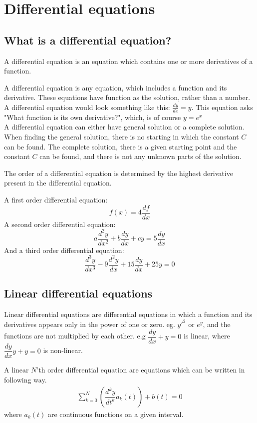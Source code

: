 \chapter{Differential equations}
\section{What is a differential equation?}
\begin{tcolorbox}[colback=blue!5!white,colframe=blue!75!black,title=Definition: Differential equation] 
A differential equation is an equation which contains one or more derivatives of a function.
\end{tcolorbox}
A differential equation is any equation, which includes a function and its derivative. These equations have function as the solution, rather than a number. 
\\
A differential equation would look something like this: $\frac{dy}{dx} = y$. This equation asks "What function is its own derivative?", which, is of course $y=e^x$
\\
A differential equation can either have general solution or a complete solution. When finding the general solution, there is no starting in which the constant $C$ can be found. The complete solution, there is a given starting point and the constant $C$ can be found, and there is not any unknown parts of the solution.
\\
\begin{tcolorbox}[colback=blue!5!white,colframe=blue!75!black,title=Definition: Order of a differential equation]
The order of a differential equation is determined by the highest derivative present in the differential equation.
\end{tcolorbox} 
\begin{tcolorbox}[colback=red!5!white,colframe=red!55!black,title=Example of differential equation of different orders] 
A first order differential equation:
$$f(x)=4\frac{df}{dx} $$
A second order differential equation:
$$a\frac{d^2y}{dx^2}+b\frac{dy}{dx}+cy = 5\frac{dy}{dx}$$
And a third order differential equation:
$$\frac{d^3y}{dx^3} - 9\frac{d^2y}{dx} + 15\frac{dy}{dx} + 25y = 0$$
\end{tcolorbox}
\section{Linear differential equations}
Linear differential equations are differential equations in which a function and its derivatives appears only in the power of one or zero. eg. $y'^2$ or $e^y$, and the functions are not multiplied by each other.
e.g $\dfrac{dy}{dx}+y=0$ is linear, where $\dfrac{dy}{dx}y+y=0$ is non-linear.
\begin{tcolorbox}[colback=blue!5!white,colframe=blue!75!black,title=Definition: $N$'th order linear differential equation]
A linear $N$'th order differential equation are equations which can be written in following way.
\begin{align*}
\sum_{k=0}^{N}\left(\dfrac{d^ky}{dt^k}a_k(t)\right)+b(t)=0
\end{align*}
where $a_k(t)$ are continuous functions on a given interval.  
\end{tcolorbox}
